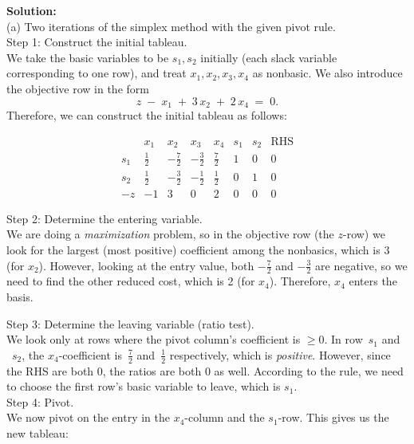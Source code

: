 \documentclass{article}
\begin{document}
\textbf{Solution: } \\

(a) Two iterations of the simplex method with the given pivot rule.\\

Step 1: Construct the initial tableau. \\

We take the basic variables to be \(s_1, s_2\) initially (each slack variable corresponding to one row), and treat \(x_1, x_2, x_3, x_4\) as nonbasic.  We also introduce the objective row in the form
\[
z \;-\; x_1 \;+\; 3\,x_2 \;+\; 2\,x_4 \;=\; 0.
\]
Therefore, we can construct the initial tableau as follows:

\[
\begin{array}{c|cccccc|c}
  & x_1 & x_2 & x_3 & x_4 & s_1 & s_2 & \text{RHS}\\\hline
s_1 & \tfrac12 & -\tfrac72 & -\tfrac32 & \tfrac72 & 1 & 0 & 0\\
s_2 & \tfrac12 & -\tfrac32 & -\tfrac12 & \tfrac12 & 0 & 1 & 0\\\hline
-z   & -1       & 3         & 0         & 2        & 0 & 0 & 0
\end{array}
\]

Step 2: Determine the entering variable. \\

We are doing a \emph{maximization} problem, so in the objective row (the \(z\)-row) we look for the largest (most positive) coefficient among the nonbasics, which is \(3\) (for \(x_2\)).  However, looking at the entry value, both $-\frac{7}{2}$ and $-\frac{3}{2}$ are negative, so we need to find the other reduced cost, which is 2 (for \(x_4\)).  Therefore, \(x_4\) enters the basis.

Step 3: Determine the leaving variable (ratio test). \\

We look only at rows where the pivot column's coefficient is \(\ge 0\).  In row~\(s_1\) and ~\(s_2\), the \(x_4\)-coefficient is \(\,\tfrac72\) and \(\,\tfrac12\) respectively, which is \emph{positive}.  However, since the RHS are both 0, the ratios are both 0 as well. According to the rule, we need to choose the first row's basic variable to leave, which is \(s_1\). \\

Step 4: Pivot. \\

We now pivot on the entry in the \(x_4\)-column and the \(s_1\)-row.  This gives us the new tableau:
\end{document}
